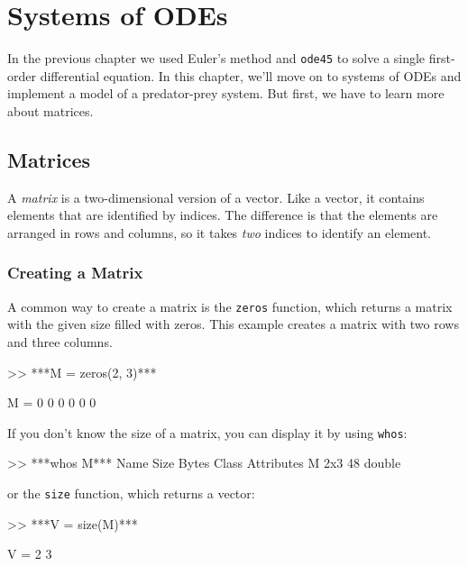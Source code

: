 \chapter{Systems of ODEs}
\label{systems}

In the previous chapter we used Euler's method and \lstinline{ode45} to solve a single first-order differential equation.  In this chapter, we'll move on to systems of ODEs and implement a model of a predator-prey system.  But first, we have to learn more about matrices.


\section{Matrices}

A \emph{matrix} is a two-dimensional version of a vector.  Like a vector,
it contains elements that are identified by indices.  The difference
is that the elements are arranged in rows and columns, so it takes
\emph{two} indices to identify an element.

\subsection{Creating a Matrix}


A common way to create a matrix is the \lstinline{zeros} function,
which returns a matrix with the given size filled with zeros.
This example creates a matrix with two rows and three columns.

\begin{code}
>> ***M = zeros(2, 3)***

M =  0     0     0
     0     0     0
\end{code}

If you don't know the size of a matrix, you can display it by using \lstinline{whos}:

\begin{code}
>> ***whos M***
  Name      Size            Bytes  Class     Attributes
  M         2x3                48  double   
\end{code}
or the \lstinline{size} function, which returns a vector:


\begin{code}
>> ***V = size(M)***

V = 2    3
\end{code}

